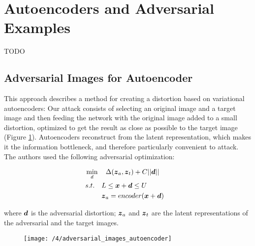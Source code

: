 \section{Autoencoders and Adversarial Examples}\label{sec:combining}
TODO

\subsection{Adversarial Images for Autoencoder}
This approach \cite{smth} describes a method for creating a distortion based
on variational autoencoders: Our attack consists of selecting an original image
and a target image and then feeding the network with the original image added to
a small distortion, optimized to get the result as close as possible to the
target image (Figure \ref{fig:adversarial_images_autoencoder}). Autoencoders
reconstruct from the latent representation, which makes it the information
bottleneck, and therefore particularly convenient to attack. The authors used
the following adversarial optimization:
    
\begin{align}
    & \min_{d} \quad \Delta(\boldsymbol{z}_{a}, \boldsymbol{z}_{t}) + C||\boldsymbol{d}|| && \\
    & s.t. \quad  
        \begin{aligned}[t]
            & L \leq \boldsymbol{x} + \boldsymbol{d} \leq U \\
            & \boldsymbol{z}_a = encoder(\boldsymbol{x} + \boldsymbol{d})
        \end{aligned}
\end{align}

where $\boldsymbol{d}$ is the adversarial distortion; $\boldsymbol{z}_{a}$ and $\boldsymbol{z}_{t}$ 
are the latent representations of the adversarial and the target images.

\begin{figure}
	\centering
	\texttt{[image: /4/adversarial\_images\_autoencoder]}
    \caption{} 
	\label{fig:adversarial_images_autoencoder}
\end{figure}